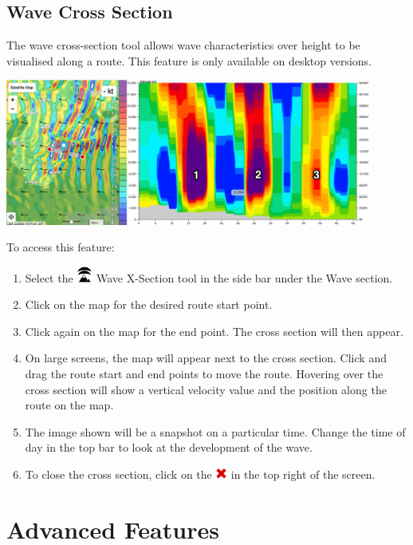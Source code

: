\documentclass[11pt,a4paper]{article}
\begin{document}
\subsection{Wave Cross Section}
The wave cross-section tool allows wave characteristics over height to be visualised along a route. This feature is only available on desktop versions.
\begin{center}
\includegraphics[width=12cm]{images/wave_x-section.png}
\end{center}

To access this feature:
\begin{enumerate}
\item Select the \includegraphics[height=15pt]{images/icons/wave.png} Wave X-Section tool in the side bar under the Wave section.
\item Click on the map for the desired route start point.
\item Click again on the map for the end point. The cross section will then appear.
\item On large screens, the map will appear next to the cross section. Click and drag the route start and end points to move the route. Hovering over the cross section will show a vertical velocity value and the position along the route on the map.
\item The image shown will be a snapshot on a particular time. Change the time of day in the top bar to look at the development of the wave.
\item To close the cross section, click on the \includegraphics[height=11pt]{images/icons/exit.png} in the top right of the screen.
\end{enumerate}
\section{Advanced Features}
\end{document}
